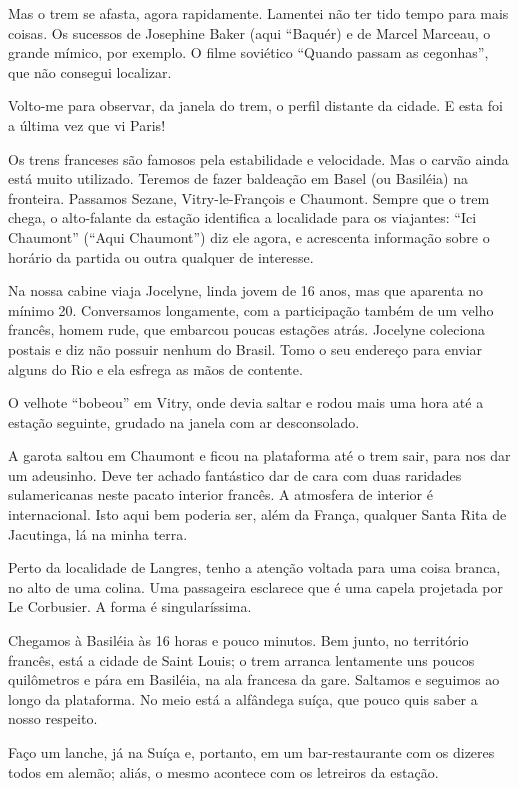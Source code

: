 Mas o trem se afasta, agora rapidamente. Lamentei não ter tido tempo para mais coisas. Os sucessos de Josephine Baker (aqui ``Baquér) e de Marcel Marceau, o grande mímico, por exemplo. O filme soviético ``Quando passam as cegonhas'', que não consegui localizar.

Volto-me para observar, da janela do trem, o perfil distante da cidade. E esta foi a última vez que vi Paris!

Os trens franceses são famosos pela estabilidade e velocidade. Mas o carvão ainda está muito utilizado. Teremos de fazer baldeação em Basel (ou Basiléia) na fronteira. Passamos Sezane, Vitry-le-François e Chaumont. Sempre que o trem chega, o alto-falante da estação identifica a localidade para os viajantes: ``Ici Chaumont'' (``Aqui Chaumont'') diz ele agora, e acrescenta informação sobre o horário da partida ou outra qualquer de interesse.

Na nossa cabine viaja Jocelyne, linda jovem de 16 anos, mas que aparenta no mínimo 20. Conversamos longamente, com a participação também de um velho francês, homem rude, que embarcou poucas estações atrás. Jocelyne coleciona postais e diz não possuir nenhum do Brasil. Tomo o seu endereço para enviar alguns do Rio e ela esfrega as mãos de contente.

O velhote ``bobeou'' em Vitry, onde devia saltar e rodou mais uma hora até a estação seguinte, grudado na janela com ar desconsolado.

A garota saltou em Chaumont e ficou na plataforma até o trem sair, para nos dar um adeusinho. Deve ter achado fantástico dar de cara com duas raridades sulamericanas neste pacato interior francês. A atmosfera de interior é internacional. Isto aqui bem poderia ser, além da França, qualquer Santa Rita de Jacutinga, lá na minha terra.

Perto da localidade de Langres, tenho a atenção voltada para uma coisa branca, no alto de uma colina. Uma passageira esclarece que é uma capela projetada por Le Corbusier. A forma é singularíssima.

Chegamos à Basiléia às 16 horas e pouco minutos. Bem junto, no território francês, está a cidade de Saint Louis; o trem arranca lentamente uns poucos quilômetros e pára em Basiléia, na ala francesa da gare. Saltamos e seguimos ao longo da plataforma. No meio está a alfândega suíça, que pouco quis saber a nosso respeito.

Faço um lanche, já na Suíça e, portanto, em um bar-restaurante com os dizeres todos em alemão; aliás, o mesmo acontece com os letreiros da estação.

